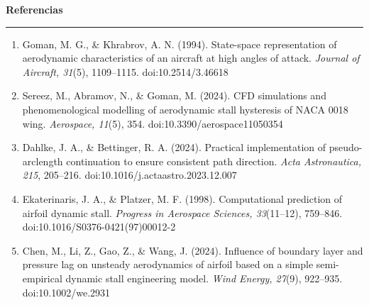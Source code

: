 \documentclass[final]{article}
\newcommand{\headingfont}{\sffamily}
\newcommand{\bloque}[1]{%
  \par\vspace{0.10cm}%
  \begin{center}
    {\headingfont\bfseries\color{utecNavy}\fontsize{29}{34}\selectfont #1}
  \end{center}%
  \vspace{-0.44cm}%
  {\color{utecNavy}\rule{\linewidth}{1.1pt}}\par
  \vspace{0.34cm}%
}
\begin{document}
\begin{minipage}[t]{37.44cm}
\bloque{Referencias}
{\fontsize{13.5}{17}\selectfont
\begin{enumerate}[leftmargin=0.62cm, itemsep=0.08cm, topsep=0.02cm]
  \item Goman, M. G., \& Khrabrov, A. N. (1994). State-space representation
        of aerodynamic characteristics of an aircraft at high angles of
        attack. \emph{Journal of Aircraft, 31}(5), 1109--1115.
        \textcolor{utecNavy}{doi:10.2514/3.46618}
  \item Sereez, M., Abramov, N., \& Goman, M. (2024). CFD simulations and
        phenomenological modelling of aerodynamic stall hysteresis of NACA
        0018 wing. \emph{Aerospace, 11}(5), 354.
        \textcolor{utecNavy}{doi:10.3390/aerospace11050354}
  \item Dahlke, J. A., \& Bettinger, R. A. (2024). Practical implementation
        of pseudo-arclength continuation to ensure consistent path direction.
        \emph{Acta Astronautica, 215}, 205--216.
        \textcolor{utecNavy}{doi:10.1016/j.actaastro.2023.12.007}
  \item Ekaterinaris, J. A., \& Platzer, M. F. (1998). Computational
        prediction of airfoil dynamic stall. \emph{Progress in Aerospace
        Sciences, 33}(11--12), 759--846.
        \textcolor{utecNavy}{doi:10.1016/S0376-0421(97)00012-2}
  \item Chen, M., Li, Z., Gao, Z., \& Wang, J. (2024). Influence of boundary
        layer and pressure lag on unsteady aerodynamics of airfoil based on a
        simple semi-empirical dynamic stall engineering model.
        \emph{Wind Energy, 27}(9), 922--935.
        \textcolor{utecNavy}{doi:10.1002/we.2931}
\end{enumerate}
}

\end{minipage}
\end{document}
